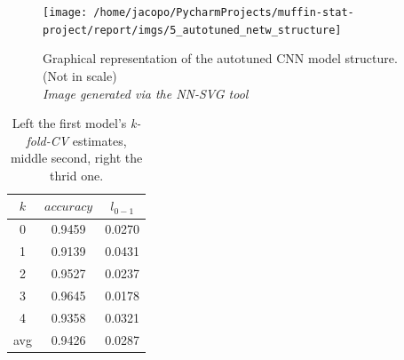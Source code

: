 \begin{figure}
    \centering
    \texttt{[image: /home/jacopo/PycharmProjects/muffin-stat-project/report/imgs/5\_autotuned\_netw\_structure]}
    \caption{
        Graphical representation of the autotuned CNN model structure. (Not in scale)\\
        \textit{Image generated via the NN-SVG tool}
    }
    \label{fig:5_autotuned_netw_structure}
\end{figure}
\begin{table}
    \centering
    \begin{tabular}{| c | c | c |}
        \hline
        $k$ & $accuracy$ & $l_{0-1}$ \\
        \hline\hline
        0   & 0.9459     & 0.0270    \\
        \hline
        1   & 0.9139     & 0.0431    \\
        \hline
        2   & 0.9527     & 0.0237    \\
        \hline
        3   & 0.9645     & 0.0178    \\
        \hline
        4   & 0.9358     & 0.0321    \\
        \hline
        \hline
        avg & 0.9426     & 0.0287    \\
        \hline
    \end{tabular}
    \caption{
        Left the first model's  \textit{k-fold-CV} estimates, middle second,  right the thrid one.
    }

    \label{tab:kfoldbestcnn}
\end{table}
